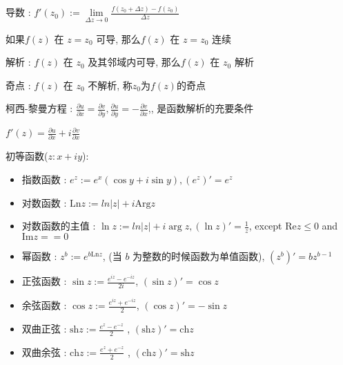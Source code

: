 \documentclass[UTF8, 12pt]{ctexart}
\begin{document}
	导数 : $ f'(z_{0}) := \lim\limits_{\Delta z \to 0} \frac{f(z_0+\Delta z) - f(z_0)}{\Delta z} $

	如果$ f(z) $ 在 $ z = z_{0} $ 可导, 那么$ f(z) $ 在 $ z = z_{0} $ 连续

	解析 : $ f(z) $ 在 $ z_{0} $ 及其邻域内可导, 那么$ f(z) $ 在 $ z_{0} $ 解析

	奇点 : $ f(z) $ 在 $ z_{0} $ 不解析, 称$ z_{0} $为$ f(z) $的奇点

	柯西-黎曼方程 : $\frac{\partial u}{\partial x} = \frac{\partial v}{\partial y}, \frac{\partial u}{\partial y} = -\frac{\partial v}{\partial x} $,, 是函数解析的充要条件

	$ f'(z) = \frac{\partial u}{\partial x} + i\frac{\partial v}{\partial x} $

	初等函数($ z : x + iy $):
	\begin{itemize}[leftmargin = 4em]
		\item 指数函数 : $ e^{z} := e^{x}(\cos y + i\sin y) , (e^{z})' = e^{z} $
		\item 对数函数 : $ \mathrm{Ln}z := ln|z| + i\mathrm{Arg}z $
		\item 对数函数的主值 : $ \ln z := ln|z| + i\arg z , (\ln z)' = \frac{1}{z}$, except $ \mathrm{Re}z \leq 0 $ and $ \mathrm{Im}z == 0 $
		\item 幂函数 : $ z^{b} := e^{b\mathrm{Ln}z} $, (当 $ b $ 为整数的时候函数为单值函数), $ (z^{b})' = bz^{b-1} $
		\item 正弦函数 : $ \sin z := \frac{e^{iz}-e^{-iz}}{2i} $, $ (\sin z)' = \cos z  $
		\item 余弦函数 : $ \cos z := \frac{e^{iz}+e^{-iz}}{2} $, $ (\cos z)' = -\sin z $
		\item 双曲正弦 : $ \mathrm{sh} z := \frac{e^{z}-e^{-z}}{2} $ , $ (\mathrm{sh}z)' = \mathrm{ch}z $
		\item 双曲余弦 : $ \mathrm{ch} z := \frac{e^{z}+e^{-z}}{2} $ , $ (\mathrm{ch}z)' = \mathrm{sh}z $
	\end{itemize}
\end{document}
